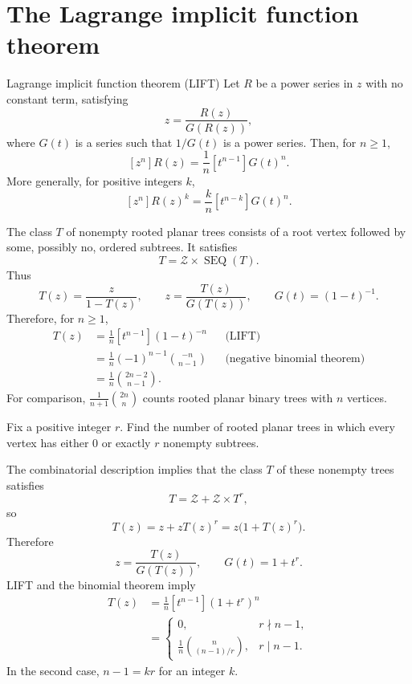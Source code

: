 \section{The Lagrange implicit function theorem}
\begin{theorem}{Lagrange implicit function theorem (LIFT)}
Let $R$ be a power series in $z$ with no constant term, satisfying
\[
z=\frac{R(z)}{G(R(z))},
\]
where $G(t)$ is a series such that $1/G(t)$ is a power series. Then, for $n\ge1$,
\[
[z^n]R(z)=\frac1n[t^{n-1}]G(t)^n.
\]
More generally, for positive integers $k$,
\[
[z^n]R(z)^k=\frac kn[t^{n-k}]G(t)^n.
\]
\end{theorem}
\begin{example}
The class $T$ of nonempty rooted planar trees consists of a root vertex followed by some, possibly no, ordered subtrees. It satisfies
\[
T=\mathcal Z\times\operatorname{SEQ}(T).
\]
Thus
\[
T(z)=\frac z{1-T(z)},\qquad
z=\frac{T(z)}{G(T(z))},\qquad G(t)=(1-t)^{-1}.
\]
Therefore, for $n\ge1$,
\begin{align*}
[z^n]T(z)
&=\frac1n[t^{n-1}](1-t)^{-n} &&\text{(LIFT)}\\
&=\frac1n(-1)^{n-1}\binom{-n}{n-1}
 &&\text{(negative binomial theorem)}\\
&=\frac1n\binom{2n-2}{n-1}.
\end{align*}
For comparison, $\displaystyle\frac1{n+1}\binom{2n}{n}$ counts rooted planar binary trees with $n$ vertices.
\end{example}
\begin{example}
Fix a positive integer $r$. Find the number of rooted planar trees in which every vertex has either $0$ or exactly $r$ nonempty subtrees.\par\medskip
The combinatorial description implies that the class $T$ of these nonempty trees satisfies
\[
T=\mathcal Z+\mathcal Z\times T^r,
\]
so
\[
T(z)=z+zT(z)^r=z\bigl(1+T(z)^r\bigr).
\]
Therefore
\[
z=\frac{T(z)}{G(T(z))},\qquad G(t)=1+t^r.
\]
LIFT and the binomial theorem imply
\begin{align*}
[z^n]T(z)&=\frac1n[t^{n-1}](1+t^r)^n\\
&=\begin{cases}
0,&r\nmid n-1,\\[2pt]
\displaystyle\frac1n\binom n{(n-1)/r},&r\mid n-1.
\end{cases}
\end{align*}
In the second case, $n-1=kr$ for an integer $k$.
\end{example}
